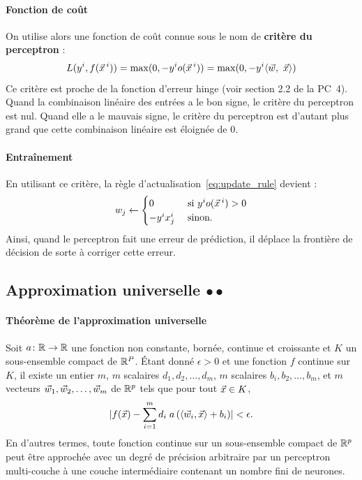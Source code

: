 \paragraph{Fonction de coût} On utilise alors une fonction de coût connue sous
le nom de \textbf{critère du perceptron} :
\begin{equation}
  \label{eq:perceptron}
  L(y^i, f(\xx^i)) = \max(0, - y^i o(\xx^i)) = 
  \max(0, - y^i \innerproduct{\ww,~\xx})
\end{equation}
Ce critère est proche de la fonction d'erreur hinge (voir section 2.2 de la
PC~4). Quand la combinaison linéaire des entrées a le bon signe, le critère du
perceptron est nul. Quand elle a le mauvais signe, le critère du perceptron est
d'autant plus grand que cette combinaison linéaire est éloignée de 0.

\paragraph{Entraînement}
En utilisant ce critère, la règle d'actualisation~\eqref{eq:update_rule}
devient :
\begin{equation*}
  \label{eq:update_rule_binclass}
  w_j \leftarrow \begin{cases}
    0 & \text{ si } y^i o(\xx^i) > 0 \\
    - y^i x_j^i & \text{ sinon.}
  \end{cases}
\end{equation*}
Ainsi, quand le perceptron fait une erreur de prédiction, il déplace la
frontière de décision de sorte à corriger cette erreur.

\subsection{Approximation universelle $\bullet \bullet$}
\label{sec:universal_approx}
\paragraph{Théorème de l'approximation universelle} 
Soit $a\colon \mathbb{R} \to \mathbb{R}$ une fonction non constante, bornée, continue et
croissante et $K$ un sous-ensemble compact de $\mathbb{R}^P$. Étant donné
$\epsilon > 0$ et une fonction $f$ continue sur $K$, il existe un entier $m$,
$m$ scalaires $d_1,d_2, \ldots, d_m$, $m$ scalaires
$b_i, b_2, \ldots, b_m$, et $m$ vecteurs $\ww_1, \ww_2, \ldots, \ww_m$ de
$\mathbb{R}^p$ tels que pour tout $\xx \in K$,
\begin{equation*}
  \lvert f(\xx) - \sum_{i=1}^m d_i \; a \left( \langle \ww_i, \xx \rangle + 
    b_i \right) \rvert < \epsilon.
\end{equation*}
En d'autres termes, toute fonction continue sur un sous-ensemble compact de
$\mathbb{R}^p$ peut être approchée avec un degré de précision arbitraire par un
perceptron multi-couche à une couche intermédiaire contenant un nombre fini
de neurones.

